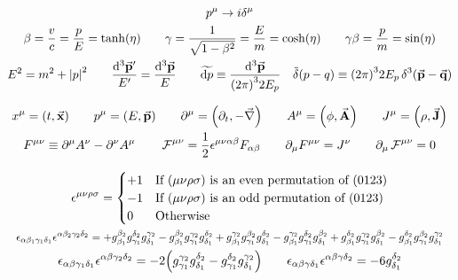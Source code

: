 \begin{gather*}
        p^\mu \to i \delta^\mu
        \\
        \beta
        = \frac{v}{c}
        = \frac{p}{E}
        = \tanh(\eta)
        \qquad
        \gamma
        = \frac{1}{\sqrt{1-\beta^2}}
        = \frac{E}{m}
        = \cosh(\eta)
        \qquad
        \gamma\beta
        = \frac{p}{m}
        = \sin(\eta)
        \\
        E^2 = m^2 + \abs{p}^2
        \qquad
        \frac{\dd[3]{\va{p}'}}{E'} = \frac{\dd[3]{\va{p}}}{E}
        \qquad
        \widetilde{\dd{p}} \equiv \frac{\dd[3]{\va{p}}}{\qty(2\pi)^32E_p}
        \quad
        \tilde{\delta}\qty(p-q) \equiv \qty(2\pi)^32E_p\Ddelta[3](\va{p}-\va{q})
\end{gather*}

\begin{gather*}
        x^{\mu} = (t, \va{x})
        \qquad
        p^{\mu} = (E, \va{p})
        \qquad
        \partial^{\mu} = \qty(\partial_t, -\va{\nabla})
        \qquad
        A^{\mu} = \qty(\phi, \va{A})
        \qquad
        J^{\mu} = \qty(\rho, \va{J})
        \\
        F^{\mu\nu} \equiv \partial^\mu A^\nu - \partial^\nu A^\mu
        \qquad
        \operatorname{\mathcal{F}}^{\mu\nu} = \frac{1}{2}\epsilon^{\mu\nu\alpha\beta}F_{\alpha\beta}
        \qquad
        \partial_\mu F^{\mu\nu} = J^{\nu}
        \qquad
        \partial_\mu \operatorname{\mathcal{F}}^{\mu\nu} = 0
\end{gather*}

\begin{gather*}
        \epsilon^{\mu\nu\rho\sigma} = \begin{cases}
                +1 &\text{If $(\mu\nu\rho\sigma)$ is an even permutation of $(0123)$} \\
                -1 &\text{If $(\mu\nu\rho\sigma)$ is an odd permutation of $(0123)$} \\
                0  &\text{Otherwise} \\
        \end{cases}
        \\
        \resizebox{\linewidth}{!}{$\displaystyle
                \epsilon_{\alpha\beta_1\gamma_1\delta_1}\epsilon^{\alpha\beta_2\gamma_2\delta_2}
                =
                + g^{\beta_2}_{\beta_1}g^{\delta_2}_{\gamma_1}g^{\gamma_2}_{\delta_1}
                - g^{\beta_2}_{\beta_1}g^{\gamma_2}_{\gamma_1}g^{\delta_2}_{\delta_1}
                + g^{\gamma_2}_{\beta_1}g^{\beta_2}_{\gamma_1}g^{\delta_2}_{\delta_1}
                - g^{\gamma_2}_{\beta_1}g^{\delta_2}_{\gamma_1}g^{\beta_2}_{\delta_1}
                + g^{\delta_2}_{\beta_1}g^{\gamma_2}_{\gamma_1}g^{\beta_2}_{\delta_1}
                - g^{\delta_2}_{\beta_1}g^{\beta_2}_{\gamma_1}g^{\gamma_2}_{\delta_1}
        $}
        \\
        \epsilon_{\alpha\beta\gamma_1\delta_1}\epsilon^{\alpha\beta\gamma_2\delta_2} = -2\qty(g_{\gamma_1}^{\gamma_2}g_{\delta_1}^{\delta_2} - g_{\gamma_1}^{\delta_2}g_{\delta_1}^{\gamma_2})
        \qquad
        \epsilon_{\alpha\beta\gamma\delta_1}\epsilon^{\alpha\beta\gamma\delta_2} = -6g_{\delta_1}^{\delta_2}
\end{gather*}
